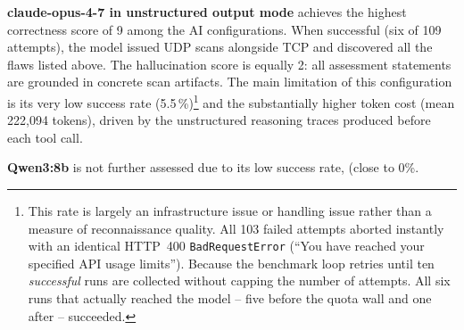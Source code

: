 \textbf{claude-opus-4-7 in unstructured output mode} achieves the highest correctness score of
9 among the \gls{AI} configurations.
When successful (six of 109 attempts), the model issued \gls{UDP} scans
alongside \gls{TCP} and discovered all the flaws listed above.
The hallucination score is equally 2: all assessment statements are grounded in concrete scan
artifacts.
The main limitation of this configuration is its very low success rate (5.5\,\%)\footnote{\label{fn:nslab-quota}%
This rate is largely an infrastructure issue or handling issue rather than a measure of reconnaissance quality.
All 103 failed attempts aborted instantly with an identical HTTP~400 \texttt{BadRequestError}
(\enquote{You have reached your specified API usage limits}). Because the benchmark loop retries until ten
\emph{successful} runs are collected without capping the number of attempts. All six runs that actually
reached the model -- five before the quota wall and one after -- succeeded.}
and the substantially higher token cost (mean 222,094 tokens), driven by the unstructured reasoning
traces produced before each tool call.

\textbf{Qwen3:8b} is not further assessed due to its low success rate, (close to 0\%.
